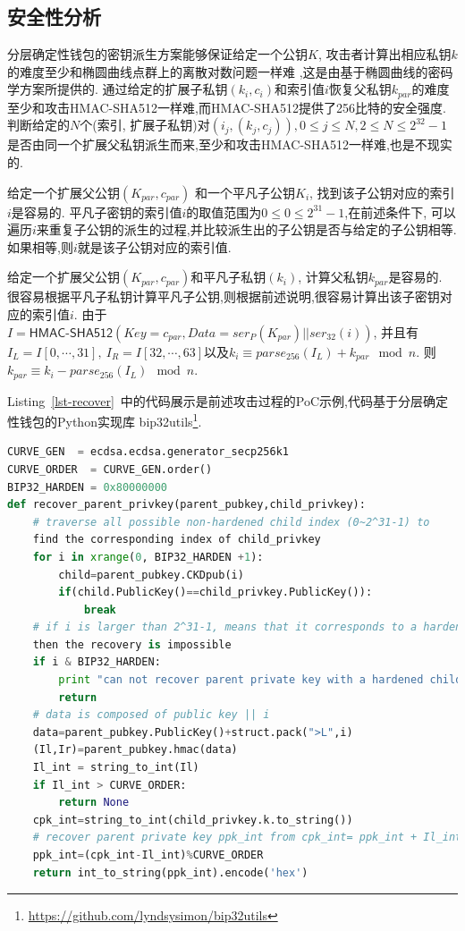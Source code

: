 \subsection{安全性分析}\label{sec-security}

分层确定性钱包的密钥派生方案能够保证给定一个公钥$K$,
攻击者计算出相应私钥$k$的难度至少和椭圆曲线点群上的离散对数问题一样难
,这是由基于椭圆曲线的密码学方案所提供的.
通过给定的扩展子私钥$(k_i,c_i)$和索引值$i$恢复父私钥$k_{par}$的难度
至少和攻击\textsf{HMAC-SHA512}一样难,而\textsf{HMAC-SHA512}提供了256比特的安全强度.
判断给定的$N$个(索引, 扩展子私钥)对$(i_j, (k_j, c_j)), 0\leq j \leq N, 2\leq N \leq 2^{32}-1$
是否由同一个扩展父私钥派生而来,至少和攻击\textsf{HMAC-SHA512}一样难,也是不现实的.

给定一个扩展父公钥$(K_{par},c_{par})$ 和一个平凡子公钥$K_i$, 找到该子公钥对应的索引$i$是容易的.
平凡子密钥的索引值$i$的取值范围为$0\leq 0\leq2^{31}-1$,在前述条件下,
可以遍历$i$来重复子公钥的派生的过程,并比较派生出的子公钥是否与给定的子公钥相等.
如果相等,则$i$就是该子公钥对应的索引值.

给定一个扩展父公钥$(K_{par},c_{par})$和平凡子私钥$(k_i)$, 计算父私钥$k_{par}$是容易的.
很容易根据平凡子私钥计算平凡子公钥,则根据前述说明,很容易计算出该子密钥对应的索引值$i$.
由于$I = \textsf{HMAC-SHA512}(Key = c_{par}, Data = ser_P(K_{par}) || ser_{32}(i))$, 
并且有$I_L = I[0,\cdots,31], \ I_R = I[32,\cdots,63]$以及$k_i \equiv parse_{256}(I_L) + k_{par} \mod n$.   
则 $k_{par} \equiv k_i-parse_{256}(I_L)\mod n.$

Listing~\ref{lst-recover}~中的代码展示是前述攻击过程的PoC示例,代码基于分层确定性钱包的Python实现库
bip32utils\footnote{\url{https://github.com/lyndsysimon/bip32utils}}.

\begin{lstlisting}[language=python, caption=基于父扩展公钥和平凡子私钥恢复父私钥的攻击示例, label=lst-recover]
CURVE_GEN  = ecdsa.ecdsa.generator_secp256k1
CURVE_ORDER  = CURVE_GEN.order()
BIP32_HARDEN = 0x80000000 
def recover_parent_privkey(parent_pubkey,child_privkey):
	# traverse all possible non-hardened child index (0~2^31-1) to 
	find the corresponding index of child_privkey
	for i in xrange(0, BIP32_HARDEN +1):
		child=parent_pubkey.CKDpub(i)
		if(child.PublicKey()==child_privkey.PublicKey()):
			break
    # if i is larger than 2^31-1, means that it corresponds to a hardened child, 
    then the recovery is impossible
	if i & BIP32_HARDEN:
		print "can not recover parent private key with a hardened child node"
		return
	# data is composed of public key || i
	data=parent_pubkey.PublicKey()+struct.pack(">L",i)
	(Il,Ir)=parent_pubkey.hmac(data)
	Il_int = string_to_int(Il)
	if Il_int > CURVE_ORDER:
	    return None
	cpk_int=string_to_int(child_privkey.k.to_string())
	# recover parent private key ppk_int from cpk_int= ppk_int + Il_int mod n
	ppk_int=(cpk_int-Il_int)%CURVE_ORDER
	return int_to_string(ppk_int).encode('hex')
\end{lstlisting}

